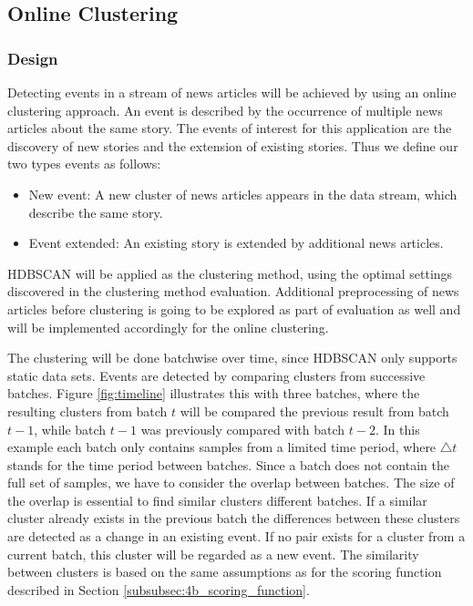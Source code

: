 \subsection{Online Clustering}
\label{subsec:4c_online_clustering}

\subsubsection{Design}
\label{subsubsec:4c_design}

Detecting events in a stream of news articles will be achieved by using an online clustering approach.
An event is described by the occurrence of multiple news articles about the same story.
The events of interest for this application are the discovery of new stories and the extension of existing stories.
Thus we define our two types events as follows:

\begin{itemize}
    \item New event: A new cluster of news articles appears in the data stream, which describe the same story.
    \item Event extended: An existing story is extended by additional news articles.
\end{itemize}

HDBSCAN will be applied as the clustering method,
using the optimal settings discovered in the clustering method evaluation.
Additional preprocessing of news articles before clustering is going to be explored
as part of evaluation as well and will be implemented accordingly for the online clustering.

The clustering will be done batchwise over time, since HDBSCAN only supports static data sets.
Events are detected by comparing clusters from successive batches.
Figure \ref{fig:timeline} illustrates this with three batches,
where the resulting clusters from batch $t$ will be compared the previous result from batch $t - 1$,
while batch $t - 1$ was previously compared with batch $t - 2$.
In this example each batch only contains samples from a limited time period,
where $\triangle t$ stands for the time period between batches.
Since a batch does not contain the full set of samples, we have to consider the overlap between batches.
The size of the overlap is essential to find similar clusters different batches.
If a similar cluster already exists in the previous batch
the differences between these clusters are detected as a change in an existing event.
If no pair exists for a cluster from a current batch, this cluster will be regarded as a new event.
The similarity between clusters is based on the same assumptions
as for the scoring function described in Section \ref{subsubsec:4b_scoring_function}.

